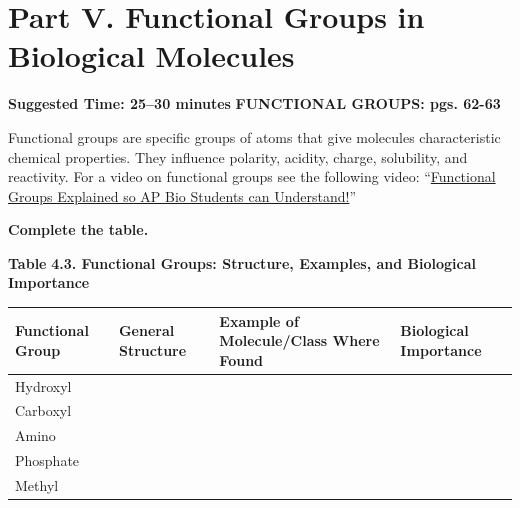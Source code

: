 \documentclass[
  letterpaper,
  DIV=11,
  numbers=noendperiod]{scrreprt}
\newcounter{none} %
\begin{document}
\section{\texorpdfstring{\textbf{Part V. Functional Groups in Biological
Molecules}}{Part V. Functional Groups in Biological Molecules}}\label{part-v.-functional-groups-in-biological-molecules}

\textbf{Suggested Time: 25--30 minutes} \textbf{FUNCTIONAL GROUPS: pgs.
62-63}

Functional groups are specific groups of atoms that give molecules
characteristic chemical properties. They influence polarity, acidity,
charge, solubility, and reactivity. For a video on functional groups see
the following video:
``\href{https://youtu.be/3rqmBK1VA_I?si=IjiQActdjHFxiCkO}{Functional
Groups Explained so AP Bio Students can Understand!}''

\textbf{Complete the table.}

\textbf{Table} \textbf{4.3. Functional Groups: Structure, Examples, and
Biological Importance}

{\def\LTcaptype{none} %
\begin{longtable}[]{@{}
  >{\raggedright\arraybackslash}p{}
  >{\raggedright\arraybackslash}p{}
  >{\raggedright\arraybackslash}p{}
  >{\raggedright\arraybackslash}p{}@{}}
\toprule\noalign{}
\begin{minipage}[b]{\linewidth}\raggedright
\textbf{Functional Group}
\end{minipage} & \begin{minipage}[b]{\linewidth}\raggedright
\textbf{General Structure}
\end{minipage} & \begin{minipage}[b]{\linewidth}\raggedright
\textbf{Example of Molecule/Class} \textbf{Where Found}
\end{minipage} & \begin{minipage}[b]{\linewidth}\raggedright
\textbf{Biological Importance}
\end{minipage} \\
\midrule\noalign{}
\endhead
\bottomrule\noalign{}
\endlastfoot
Hydroxyl & & & \\
Carboxyl & & & \\
Amino & & & \\
Phosphate & & & \\
Methyl & & & \\
\end{longtable}
}
\end{document}
